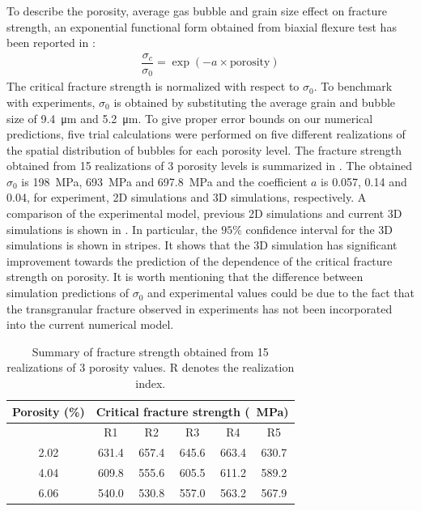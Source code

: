 To describe the porosity, average gas bubble and grain size effect on fracture strength, an exponential functional form obtained from biaxial flexure test has been reported in \cite{oguma_1982}:
\begin{align}
  \dfrac{\sigma_c}{\sigma_0} = \exp(-a \times \text{porosity})
\end{align}
The critical fracture strength is normalized with respect to $\sigma_0$. To benchmark with experiments, $\sigma_0$ is obtained by substituting the average grain and bubble size of \SI{9.4}{\micro\meter} and \SI{5.2}{\micro\meter}. To give proper error bounds on our numerical predictions, five trial calculations were performed on five different realizations of the spatial distribution of bubbles for each porosity level. The fracture strength obtained from 15 realizations of 3 porosity levels is summarized in . The obtained $\sigma_0$ is \SI{198}{\mega\pascal}, \SI{693}{\mega\pascal} and \SI{697.8}{\mega\pascal} and the coefficient $a$ is 0.057, 0.14 and 0.04, for experiment, 2D simulations and 3D simulations, respectively.
A comparison of the experimental model, previous 2D simulations \cite{pritam_2016} and current 3D simulations is shown in . In particular, the $95\%$ confidence interval for the 3D simulations is shown in stripes. It shows that the 3D simulation has significant improvement towards the prediction of the dependence of the critical fracture strength on porosity. It is worth mentioning that the difference between simulation predictions of $\sigma_0$ and experimental values could be due to the fact that the transgranular fracture observed in experiments \cite{evans_1969} has not been incorporated into the current numerical model.

\begin{table}[!htb]
  \centering
  \caption{Summary of fracture strength obtained from 15 realizations of 3 porosity values. R denotes the realization index.}
  \begin{tabular}{*6c}
    \toprule
    Porosity (\%) & \multicolumn{5}{c}{Critical fracture strength (\SI{}{\mega\pascal})}                                 \\
    \midrule
                  & R1                                                                   & R2    & R3    & R4    & R5    \\
    \midrule
    2.02          & 631.4                                                                & 657.4 & 645.6 & 663.4 & 630.7 \\
    4.04          & 609.8                                                                & 555.6 & 605.5 & 611.2 & 589.2 \\
    6.06          & 540.0                                                                & 530.8 & 557.0 & 563.2 & 567.9 \\
    \bottomrule
  \end{tabular}
  \label{fs15}
\end{table}

